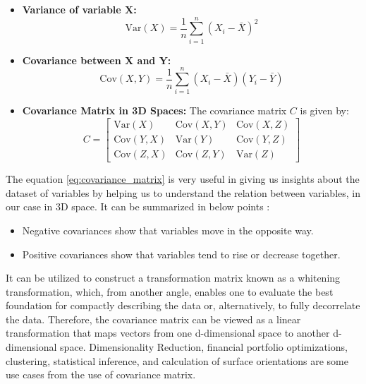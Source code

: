 \begin{itemize}
    \item \textbf{Variance of variable X:}
    \begin{equation}
    \text{Var}(X) = \frac{1}{n} \sum_{i=1}^{n} (X_i - \bar{X})^2
    \end{equation}
    
    \item \textbf{Covariance between X and Y:}
    \begin{equation}\label{eq:covariance}
    \text{Cov}(X, Y) = \frac{1}{n} \sum_{i=1}^{n} (X_i - \bar{X})(Y_i - \bar{Y})
    \end{equation}
    
    \item \textbf{Covariance Matrix in 3D Spaces:}
    The covariance matrix \(C\) is given by:
    \begin{equation}\label{eq:covariance_matrix}
    C = \begin{bmatrix}
    \text{Var}(X) & \text{Cov}(X, Y) & \text{Cov}(X, Z) \\
    \text{Cov}(Y, X) & \text{Var}(Y) & \text{Cov}(Y, Z) \\
    \text{Cov}(Z, X) & \text{Cov}(Z, Y) & \text{Var}(Z)
    \end{bmatrix}
    \end{equation}
\end{itemize}

The equation \ref{eq:covariance_matrix} is very useful in giving us insights about the dataset of variables by helping us to understand the relation between variables, in our case in 3D space. It can be summarized in below points :
\begin{itemize}
    \item  Negative covariances show that variables move in the opposite way.
    \item Positive covariances show that variables tend to rise or decrease together.
\end{itemize}

It can be utilized to construct a transformation matrix known as a whitening transformation, which, from another angle, enables one to evaluate the best foundation for compactly describing the data or, alternatively, to fully decorrelate the data. Therefore, the covariance matrix can be viewed as a linear transformation that maps vectors from one d-dimensional space to another d-dimensional space. Dimensionality Reduction, financial portfolio optimizations, clustering, statistical inference, and calculation of surface orientations are some use cases from the use of covariance matrix.

